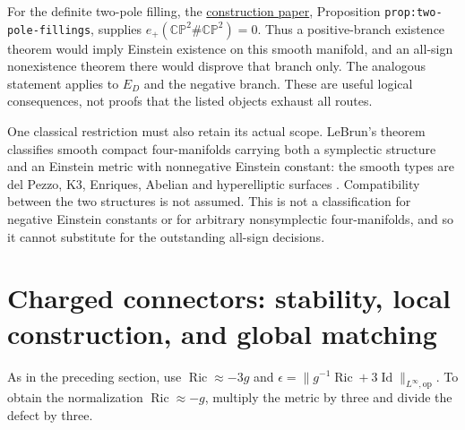 \documentclass[a4paper,11pt]{article}
\numberwithin{equation}{section}
\theoremstyle{definition}
\newcommand{\Ric}{\operatorname{Ric}}
\newcommand{\Id}{\operatorname{Id}}
\newcommand{\op}{\mathrm{op}}
\newcommand{\CP}{\mathbb{CP}}
\begin{document}
For the definite two-pole filling, the \href{20260916_construction.tex}{construction paper}, Proposition \texttt{prop:two-pole-fillings}, supplies $e_+(\CP^2\#\CP^2)=0$. Thus a positive-branch existence theorem would imply Einstein existence on this smooth manifold, and an all-sign nonexistence theorem there would disprove that branch only. The analogous statement applies to $E_D$ and the negative branch. These are useful logical consequences, not proofs that the listed objects exhaust all routes.

One classical restriction must also retain its actual scope. LeBrun's theorem classifies smooth compact four-manifolds carrying both a symplectic structure and an Einstein metric with nonnegative Einstein constant: the smooth types are del Pezzo, K3, Enriques, Abelian and hyperelliptic surfaces \cite[Theorem B]{LeBrunSymplectic}. Compatibility between the two structures is not assumed. This is not a classification for negative Einstein constants or for arbitrary nonsymplectic four-manifolds, and so it cannot substitute for the outstanding all-sign decisions.

\section{Charged connectors: stability, local construction, and global matching}
As in the preceding section, use $\Ric\approx-3g$ and
$\epsilon=\|g^{-1}\Ric+3\Id\|_{L^\infty,\op}$.
To obtain the normalization $\Ric\approx-g$, multiply the metric by three and divide the defect by three.
\end{document}
